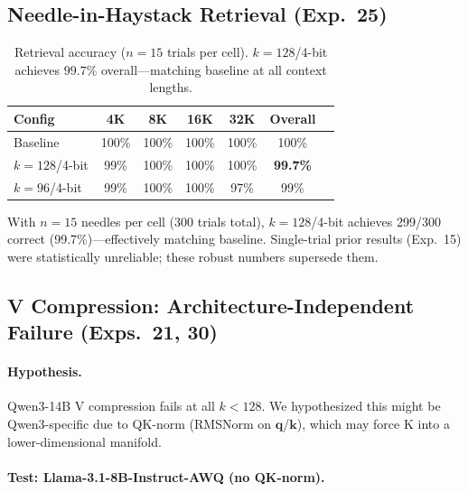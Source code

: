 \documentclass{article}
\begin{document}
\subsection{Needle-in-Haystack Retrieval (Exp.~25)}
\label{sec:needle}

\begin{table}[h]
  \centering
  \caption{Retrieval accuracy ($n{=}15$ trials per cell). $k{=}128$/4-bit achieves
  $99.7\%$ overall---matching baseline at all context lengths.}
  \label{tab:needle}
  \begin{tabular}{@{}lcccccc@{}}
    \toprule
    Config & 4K & 8K & 16K & 32K & Overall \\
    \midrule
    Baseline           & 100\% & 100\% & 100\% & 100\% & 100\% \\
    $k{=}128$/4-bit    & 99\%  & 100\% & 100\% & 100\% & \textbf{99.7\%} \\
    $k{=}96$/4-bit     & 99\%  & 100\% & 100\% & 97\%  & 99\% \\
    \bottomrule
  \end{tabular}
\end{table}

With $n{=}15$ needles per cell (300 trials total), $k{=}128$/4-bit achieves 299/300
correct (99.7\%)---effectively matching baseline. Single-trial prior results
(Exp.~15) were statistically unreliable; these robust numbers supersede them.

\subsection{V Compression: Architecture-Independent Failure (Exps.~21, 30)}
\label{sec:v_failure}

\paragraph{Hypothesis.}
Qwen3-14B V compression fails at all $k < 128$. We hypothesized this might be
Qwen3-specific due to QK-norm (RMSNorm on $\mathbf{q}$/$\mathbf{k}$), which may
force K into a lower-dimensional manifold.

\paragraph{Test: Llama-3.1-8B-Instruct-AWQ (no QK-norm).}
\end{document}
